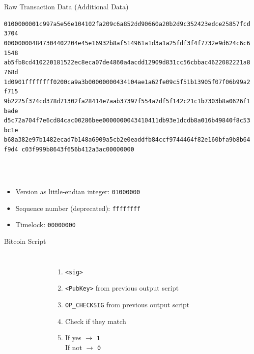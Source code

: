 \documentclass[handout]{beamer}
\begin{document}
\begin{frame}{Raw Transaction Data (Additional Data)}
\begin{scriptsize}
\texttt{\alert<2>{01000000}\textcolor{black!30}{01c997a5e56e104102fa209c6a852dd90660a20b2d9c352423edce25857fcd3704
000000004847304402204e45e16932b8af514961a1d3a1a25fdf3f4f7732e9d624c6c61548
ab5fb8cd410220181522ec8eca07de4860a4acdd12909d831cc56cbbac4622082221a8768d
1d0901}\alert<3>{ffffffff}\textcolor{black!30}{0200ca9a3b00000000434104ae1a62fe09c5f51b13905f07f06b99a2f715
9b2225f374cd378d71302fa28414e7aab37397f554a7df5f142c21c1b7303b8a0626f1bade
d5c72a704f7e6cd84cac00286bee0000000043410411db93e1dcdb8a016b49840f8c53bc1e
b68a382e97b1482ecad7b148a6909a5cb2e0eaddfb84ccf9744464f82e160bfa9b8b64f9d4
c03f999b8643f656b412a3ac}\alert<4>{00000000}}
\vspace{1em}
\end{scriptsize}
\scriptsize \\
\\
\begin{itemize}
	\item \alert<2>{Version as little-endian integer: \texttt{01000000}}
	\item \alert<3>{Sequence number (deprecated): \texttt{ffffffff}}
	\item \alert<4>{Timelock: \texttt{00000000}}
\end{itemize}
\end{frame}

\begin{frame}{Bitcoin Script}
\begin{columns}
\begin{figure}
	
\end{figure}

\begin{enumerate}
\item<1-> \texttt{<sig>}
\item<2-> \texttt{<PubKey>} from previous output script
\item<3-> \texttt{OP\_CHECKSIG} from previous output script
\item<4-> Check if they match
\item<5-> If yes $\rightarrow$ \texttt{1} \\ If not $\rightarrow$ \texttt{0} 
\end{enumerate}

\end{columns}
\end{frame}
\end{document}

